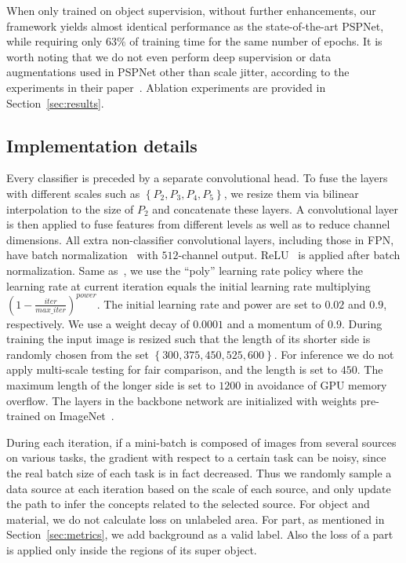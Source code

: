 \documentclass[runningheads]{llncs}
\begin{document}
When only trained on object supervision, without further enhancements, our framework yields almost identical performance as the state-of-the-art PSPNet, while requiring only $63\%$ of training time for the same number of epochs. It is worth noting that we do not even perform deep supervision or data augmentations used in PSPNet other than scale jitter, according to the experiments in their paper~\cite{zhao2017pyramid}. Ablation experiments are provided in Section~\ref{sec:results}.

\subsection{Implementation details}
Every classifier is preceded by a separate convolutional head. To fuse the layers with different scales such as $\left\{ P_2, P_3, P_4, P_5 \right\}$, we resize them via bilinear interpolation to the size of $P_2$ and concatenate these layers. A convolutional layer is then applied to fuse features from different levels as well as to reduce channel dimensions. All extra non-classifier convolutional layers, including those in FPN, have batch normalization~\cite{ioffe2015batch} with $512$-channel output. ReLU~\cite{nair2010rectified} is applied after batch normalization. Same as~\cite{chen2016deeplab}, we use the ``poly'' learning rate policy where the learning rate at current iteration equals the initial learning rate multiplying $\left( 1 - \frac{iter}{max\_iter}\right)^{power}$. The initial learning rate and power are set to $0.02$ and $0.9$, respectively. We use a weight decay of $0.0001$ and a momentum of $0.9$. During training the input image is resized such that the length of its shorter side is randomly chosen from the set $\left\{300, 375, 450, 525, 600\right\}$. For inference we do not apply multi-scale testing for fair comparison, and the length is set to $450$. The maximum length of the longer side is set to $1200$ in avoidance of GPU memory overflow. The layers in the backbone network are initialized with weights pre-trained on ImageNet~\cite{deng2009imagenet}. 

During each iteration, if a mini-batch is composed of images from several sources on various tasks, the gradient with respect to a certain task can be noisy, since the real batch size of each task is in fact decreased. Thus we randomly sample a data source at each iteration based on the scale of each source, and only update the path to infer the concepts related to the selected source. For object and material, we do not calculate loss on unlabeled area. For part, as mentioned in Section~\ref{sec:metrics}, we add background as a valid label. Also the loss of a part is applied only inside the regions of its super object.
\end{document}

